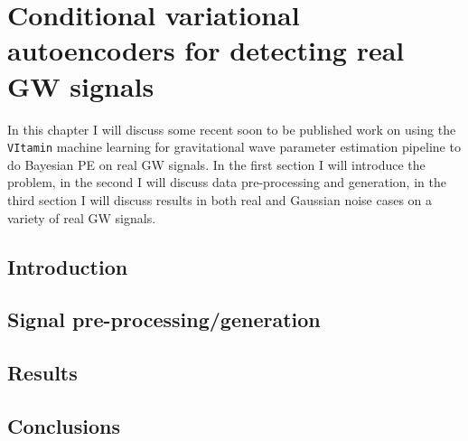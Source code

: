 \chapter{Conditional variational autoencoders for detecting real GW signals}

In this chapter I will discuss some recent soon to be published work on using the \texttt{VItamin} machine learning for gravitational wave parameter estimation pipeline to do Bayesian PE on real \ac{GW} signals. In the first section I will introduce the problem, in the second I will discuss data pre-processing and generation, in the third section I will discuss results in both real and Gaussian noise cases on a variety of real \ac{GW} signals.

\section{Introduction}

\section{Signal pre-processing/generation}

\section{Results}

\section{Conclusions}


